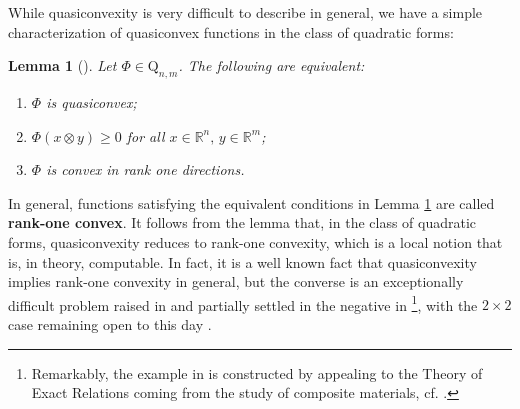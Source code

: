 \documentclass[a4paper]{article}
\numberwithin{equation}{section}
\newcommand{\R}{\mathbb{R}}
\newtheorem{lemma}[theorem]{Lemma}
\theoremstyle{definition}
\theoremstyle{remark}
\newcommand{\qnm}{\mathrm{Q}_{n,m}}
\begin{document}
While quasiconvexity is very difficult to describe in general, we have a simple characterization of quasiconvex functions in the class of quadratic forms:
\begin{lemma}[{\cite{vanhovezbMATH03046021}}]\label{lem:qc_r1c}
Let $\Phi\in\qnm$. The following are equivalent:
\begin{enumerate}
    \item\label{itm:a} $\Phi$ is quasiconvex;
    \item\label{itm:b} $\Phi(x\otimes y)\geq 0$ for all $x\in\R^n,\,y\in\R^m$;
    \item\label{itm:c} $\Phi$ is convex in rank one directions.
\end{enumerate}
\end{lemma}
In general, functions satisfying the equivalent conditions in Lemma \ref{lem:qc_r1c} are called \textbf{rank-one convex}. It follows from the lemma that, in the class of quadratic forms, quasiconvexity reduces to rank-one convexity, which is a local notion that is, in theory, computable. In fact, it is a well known fact that quasiconvexity implies rank-one convexity in general, but the converse is an exceptionally difficult problem raised in \cite{morrey52} and partially settled in the negative in \cite{Sverak,Grabovski}\footnote{Remarkably, the example in \cite{Grabovski} is constructed by appealing to the Theory of Exact Relations coming from the study of composite materials, cf. \cite{GrabovskyBook,MiltonBook}.}, with the $2\times 2$ case remaining open to this day \cite{FaracoSzekelyhidi,HKL}. 
\end{document}
